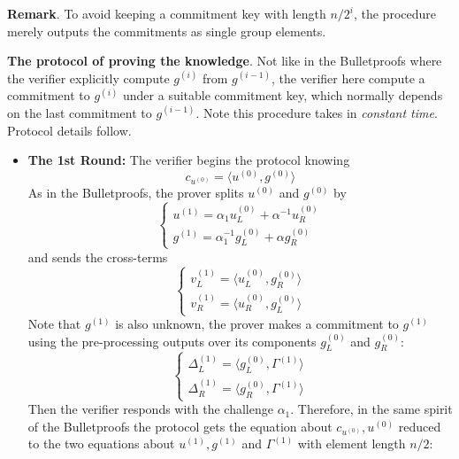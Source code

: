 \documentclass{article}
\begin{document}
\textbf{Remark}. To avoid keeping a commitment key with length $n/2^i$, the procedure merely outputs the commitments as single group elements. 

\textbf{The protocol of proving the knowledge}. Not like in the Bulletproofs where the verifier explicitly compute $g^{(i)}$ from $g^{(i-1)}$, the verifier here compute a commitment to $g^{(i)}$ under a suitable commitment key, which normally depends on the last commitment to $g^{(i-1)}$. Note this procedure takes in \textit{constant time}. Protocol details follow.

\begin{itemize}
\item \textbf{The 1st Round: } The verifier begins the protocol knowing 
\begin{equation*}
c_{u^{(0)}} = \langle u^{(0)}, g^{(0)}\rangle
\end{equation*}
As in the Bulletproofs, the prover splits $u^{(0)}$ and $g^{(0)}$ by
\begin{equation*}
\begin{cases}
u^{(1)} = \alpha_1 u^{(0)}_L + \alpha^{-1} u^{(0)}_R \\
g^{(1)} = \alpha_1^{-1} g^{(0)}_L + \alpha g^{(0)}_{R}
\end{cases}
\end{equation*}
and sends the cross-terms
\begin{equation*}
\begin{cases}
v^{(1)}_L = \langle u^{(0)}_L, g^{(0)}_R\rangle \\
v^{(1)}_R = \langle u^{(0)}_R, g^{(0)}_L\rangle 
\end{cases}
\end{equation*}
Note that $g^{(1)}$ is also unknown, the prover makes a commitment to $g^{(1)}$ using the pre-processing outputs over its components $g^{(0)}_L$ and $g^{(0)}_R$: 
\begin{equation*}
\begin{cases}
\Delta^{(1)}_L = \langle g^{(0)}_L, \Gamma^{(1)} \rangle \\
\Delta^{(1)}_R = \langle g^{(0)}_R, \Gamma^{(1)} \rangle
\end{cases}
\end{equation*}
Then the verifier responds with the challenge $\alpha_1$. Therefore, in the same spirit of the Bulletproofs the protocol gets the equation about $c_{u^{(0)}}, u^{(0)}$ reduced to the two equations about $u^{(1)}, g^{(1)}$ and $\Gamma^{(1)}$ with element length $n/2$:
\begin{equation*}

\end{equation*}
\end{itemize}
\end{document}
